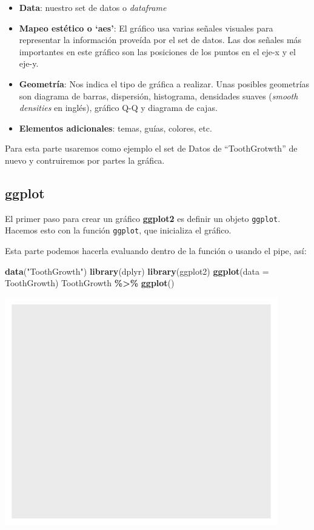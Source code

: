\documentclass[
]{book}
\newenvironment{Shaded}{\begin{snugshade}}{\end{snugshade}}
\newcommand{\AttributeTok}[1]{\textcolor[rgb]{0.13,0.29,0.53}{#1}}
\newcommand{\FunctionTok}[1]{\textcolor[rgb]{0.13,0.29,0.53}{\textbf{#1}}}
\newcommand{\NormalTok}[1]{#1}
\newcommand{\SpecialCharTok}[1]{\textcolor[rgb]{0.81,0.36,0.00}{\textbf{#1}}}
\newcommand{\StringTok}[1]{\textcolor[rgb]{0.31,0.60,0.02}{#1}}
\begin{document}
\begin{itemize}
\item
  \textbf{Data}: nuestro set de datos o \emph{dataframe}
\item
  \textbf{Mapeo estético o `aes'}: El gráfico usa varias señales visuales para representar la información proveída por el set de datos.
  Las dos señales más importantes en este gráfico son las posiciones de los puntos en el eje-x y el eje-y.
\item
  \textbf{Geometría}: Nos indica el tipo de gráfica a realizar.
  Unas posibles geometrías son diagrama de barras, dispersión, histograma, densidades suaves (\emph{smooth densities} en inglés), gráfico Q-Q y diagrama de cajas.
\item
  \textbf{Elementos adicionales}: temas, guías, colores, etc.
\end{itemize}

Para esta parte usaremos como ejemplo el set de Datos de ``ToothGrotwth'' de nuevo y contruiremos por partes la gráfica.

\subsection{ggplot}\label{ggplot}

El primer paso para crear un gráfico \textbf{ggplot2} es definir un objeto \texttt{ggplot}.
Hacemos esto con la función \texttt{ggplot}, que inicializa el gráfico.

Esta parte podemos hacerla evaluando dentro de la función o usando el pipe, así:

\begin{Shaded}
\begin{Highlighting}[]
\FunctionTok{data}\NormalTok{(}\StringTok{"ToothGrowth"}\NormalTok{)}
\FunctionTok{library}\NormalTok{(dplyr)}
\FunctionTok{library}\NormalTok{(ggplot2)}
\FunctionTok{ggplot}\NormalTok{(}\AttributeTok{data =}\NormalTok{ ToothGrowth)}
\NormalTok{ToothGrowth }\SpecialCharTok{\%\textgreater{}\%} \FunctionTok{ggplot}\NormalTok{()}
\end{Highlighting}
\end{Shaded}

\begin{center}\includegraphics{R_Manual_files/figure-latex/unnamed-chunk-204-1} \end{center}
\end{document}

